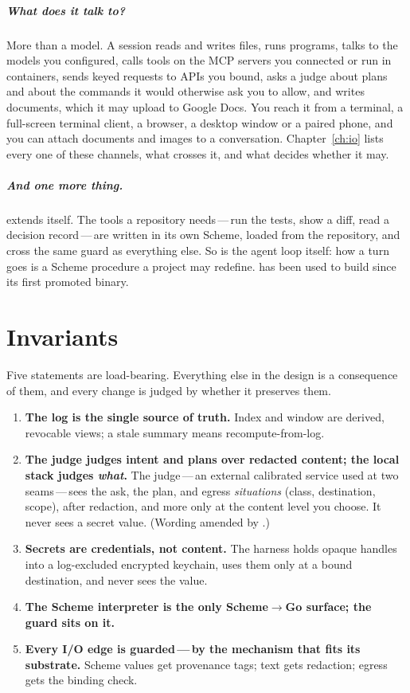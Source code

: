 \paragraph{What does it talk to?} More than a model. A session reads and
writes files, runs programs, talks to the models you configured, calls
tools on the MCP servers you connected or run in containers, sends keyed
requests to APIs you bound, asks a judge about plans and about the
commands it would otherwise ask you to allow, and writes documents, which
it may upload to Google Docs. You reach it from a terminal, a
full-screen terminal client, a browser, a desktop window or a paired phone,
and you can attach documents and images to a conversation. Chapter~\ref{ch:io} lists
every one of these channels, what crosses it, and what decides whether it
may.

\paragraph{And one more thing.} \nodwyn{} extends itself. The tools a
repository needs\,---\,run the tests, show a diff, read a decision
record\,---\,are written in its own Scheme, loaded from the repository, and
cross the same guard as everything else. So is the agent loop itself: how a
turn goes is a Scheme procedure a project may redefine. \nodwyn{} has been
used to build \nodwyn{} since its first promoted binary.

\chapter{Invariants}

Five statements are load-bearing. Everything else in the design is a
consequence of them, and every change is judged by whether it preserves
them.

\begin{enumerate}[leftmargin=2em]
\item \textbf{The log is the single source of truth.} Index and window are
  derived, revocable views; a stale summary means recompute-from-log.
\item \textbf{The judge judges intent and plans over redacted content; the
  local stack judges \emph{what}.} The judge\,---\,an external calibrated service used
  at two seams\,---\,sees the ask, the plan, and egress \emph{situations}
  (class, destination, scope), after redaction, and more only at the
  content level you choose. It never sees a secret value. (Wording amended
  by .)
\item \textbf{Secrets are credentials, not content.} The harness holds opaque
  handles into a log-excluded encrypted keychain, uses them only at a bound
  destination, and never sees the value.
\item \textbf{The Scheme interpreter is the only Scheme$\to$Go surface; the
  guard sits on it.}
\item \textbf{Every I/O edge is guarded\,---\,by the mechanism that fits its
  substrate.} Scheme values get provenance tags; text gets redaction; egress
  gets the binding check.
\end{enumerate}


